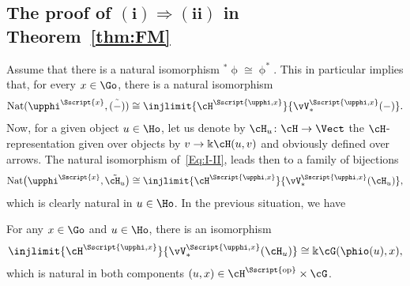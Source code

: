 \subsection[The proof of $(i) \Rightarrow (ii)$ in Theorem~\ref{thm:FM}]{The proof of $\boldsymbol{(i) \Rightarrow (ii)}$ in Theorem~\ref{thm:FM}}\label{sssec:I-II}
Assume that there is a natural isomorphism ${}^{*}\upphi \cong \upphi^{*}$. This in particular implies that, for every $x \in \Go$, there is a natural isomorphism
\begin{gather}\label{Eq:I-II}
{\rm Nat}(\upphi^{\Sscript{x}}, \tilde{(-)}) \cong \injlimit{\cH^{\Sscript{\upphi, x}}}{\vV^{\Sscript{\upphi, x}}_*(-)}.
\end{gather}
Now, for a given object $u \in \Ho$, let us denote by $\cH_{u}\colon \cH \to \Vect$ the $\cH$-representation given over objects by $v \to \Bbbk \cH(u, v)$ and obviously defined over arrows. The natural isomorphism of~\eqref{Eq:I-II}, leads then to a family of bijections
\begin{gather*}
{\rm Nat}\big(\upphi^{\Sscript{x}}, \tilde{\cH_{u}}\big) \cong \injlimit{\cH^{\Sscript{\upphi, x}}}{\vV^{\Sscript{\upphi, x}}_*(\cH_{u})},
\end{gather*}
which is clearly natural in $u \in \Ho$. In the previous situation, we have
\begin{Lemma}\label{lema:I-II-1} For any $x \in\Go$ and $u \in \Ho$, there is an isomorphism
\begin{gather*}
\injlimit{\cH^{\Sscript{\upphi, x}}}{\vV^{\Sscript{\upphi,x}}_*(\cH_{u})} \cong \Bbbk \cG(\phio(u),x),
\end{gather*}
which is natural in both components $(u, x) \in \cH^{\Sscript{\rm op}} \times \cG$.
\end{Lemma}
